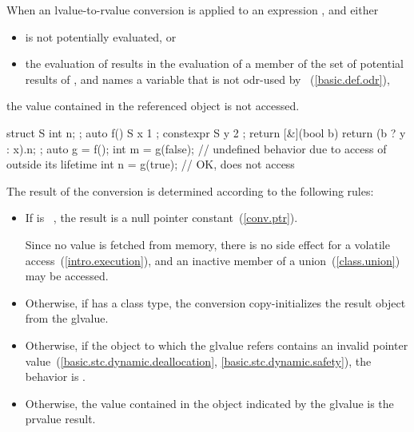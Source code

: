 \pnum
When an lvalue-to-rvalue conversion
is applied to an expression , and either
\begin{itemize}
\item {} is not potentially evaluated, or
\item the evaluation of  results in the evaluation of a member
       of the set of potential results of , and 
      names a variable  that is not odr-used by
      ~(\ref{basic.def.odr}),
\end{itemize}
the value contained in the referenced object is not accessed.
\begin{example}
\begin{codeblock}
struct S { int n; };
auto f() {
  S x { 1 };
  constexpr S y { 2 };
  return [&](bool b) { return (b ? y : x).n; };
}
auto g = f();
int m = g(false);   // undefined behavior due to access of  outside its lifetime
int n = g(true);    // OK, does not access 
\end{codeblock}
\end{example}

\pnum
The result of the conversion is determined according to the
following rules:

\begin{itemize}

\item If  is \cv{}~, the result is a
null pointer constant~(\ref{conv.ptr}).
\begin{note}
Since no value is fetched from memory,
there is no side effect for a volatile access~(\ref{intro.execution}), and
an inactive member of a union~(\ref{class.union}) may be accessed.
\end{note}

\item Otherwise, if  has a class
type, the conversion copy-initializes the result object from
the glvalue.

\item Otherwise, if the object to which the glvalue refers contains an invalid
pointer value~(\ref{basic.stc.dynamic.deallocation},
\ref{basic.stc.dynamic.safety}), the behavior is
.

\item Otherwise, the value contained in the object indicated by the
glvalue is the prvalue result.

\end{itemize}

